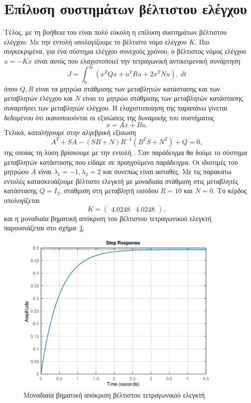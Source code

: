 \section{Επίλυση συστημάτων βέλτιστου ελέγχου}
Τέλος, με τη βοήθεια του  είναι πολύ εύκολη η επίλυση συστημάτων
βέλτιστου ελέγχου. Με την εντολή
υπολογίζουμε το βέλτιστο νόμο ελέγχου \( K \). Πιο συγκεκριμένα, για ένα σύστημα
ελέγχου συνεχούς χρόνου, ο βέλτιστος νόμος ελέγχου \( u = -Kx \) είναι αυτός που
ελαχιστοποιεί την τετραγωνική αντικειμενική συνάρτηση
\[
    J = \int_0^{\infty} \left( x^TQx + u^TRu + 2x^TNu \right) ,\ dt
\]
όπου \( Q, R \) είναι τα μητρώα στάθμισης των μεταβλητών κατάστασης και των
μεταβλητών ελέγχου και \( N \) είναι το μητρώο στάθμισης των μεταβλητών
κατάστασης συναρτήσει των μεταβλητών ελέγχου. Η ελαχιστοποίηση της παραπάνω
γίνεται δεδομένου ότι ικανοποιούνται οι εξισώσεις της δυναμικής του συστήματος
\[
    \dot{x} = Ax + Bu.
\]
Τελικά, καταλήγουμε στην αλγεβρική εξίσωση 
\[
    A^T + SA - (SB + N)R^{-1}(B^TS + N^T) + Q = 0,
\]
της οποίας τη λύση βρίσκουμε με την εντολή . Σαν παράδειγμα θα δούμε
το σύστημα μεταβλητών κατάστασης που είδαμε σε προηγούμενο παράδειγμα. Οι
ιδιοτιμές του μητρώου \( A \) είναι \( \lambda_1 = -1, \lambda_2 = 2 \)
και συνεπώς είναι ασταθές. Με τις παρακάτω εντολές κατασκευάζουμε βέλτιστο
ελεγκτή με μοναδιαία στάθμιση στις μεταβλητές κατάστασης \( Q = I_2 \),
στάθμιση στη μεταβλητή εισόδου \( R = 10 \) και \( N = 0 \).
\eng{}
Το κέρδος υπολογίζεται
\[
    K = \begin{pmatrix}4.0248 & 4.0248\end{pmatrix},
\]
και η μοναδιαία βηματική απόκριση του βέλτιστου τετραγωνικού ελεγκτή
παρουσιάζεται στο σχήμα~\ref{fig:prelim8}.
\begin{figure}[h!]
    \centering
    \includegraphics[width=0.9\textwidth]{figures/prelim8.eps}
    \caption{Μοναδιαία βηματική απόκριση βέλτιστου τετραγωνικού ελεγκτή}
    \label{fig:prelim8}
\end{figure}
